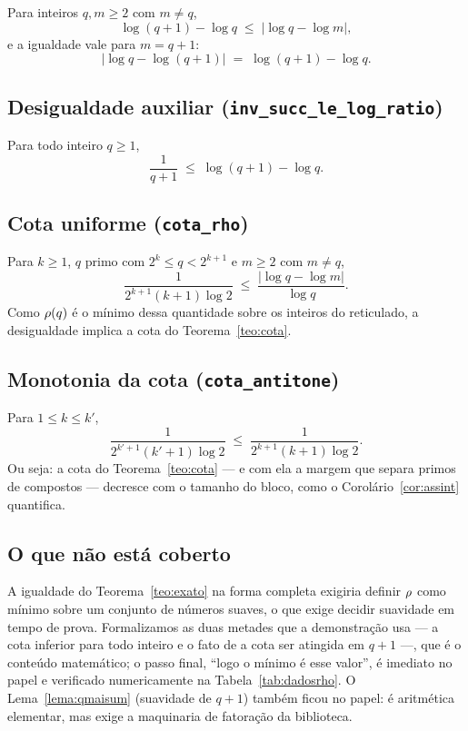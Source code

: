 \noindent Para inteiros $q,m\ge2$ com $m\neq q$,
\[
  \log(q+1)-\log q \;\le\; \bigl|\log q-\log m\bigr| ,
\]
e a igualdade vale para $m=q+1$:
\[
  \bigl|\log q-\log(q+1)\bigr| \;=\; \log(q+1)-\log q .
\]

\subsection*{Desigualdade auxiliar (\texttt{inv\_succ\_le\_log\_ratio})}

\noindent Para todo inteiro $q\ge1$,
\[
  \frac{1}{q+1} \;\le\; \log(q+1)-\log q .
\]

\subsection*{Cota uniforme (\texttt{cota\_rho})}

\noindent Para $k\ge1$, $q$ primo com $2^k\le q<2^{k+1}$ e $m\ge2$ com $m\neq q$,
\[
  \frac{1}{2^{k+1}(k+1)\log 2}
  \;\le\;
  \frac{\bigl|\log q-\log m\bigr|}{\log q} .
\]
Como $\rho(q)$ é o mínimo dessa quantidade sobre os inteiros do reticulado, a
desigualdade implica a cota do Teorema~\ref{teo:cota}.

\subsection*{Monotonia da cota (\texttt{cota\_antitone})}

\noindent Para $1\le k\le k'$,
\[
  \frac{1}{2^{k'+1}(k'+1)\log 2}
  \;\le\;
  \frac{1}{2^{k+1}(k+1)\log 2} .
\]
Ou seja: a cota do Teorema~\ref{teo:cota} — e com ela a margem que separa primos
de compostos — decresce com o tamanho do bloco, como o
Corolário~\ref{cor:assint} quantifica.

\subsection*{O que não está coberto}

A igualdade do Teorema~\ref{teo:exato} na forma completa exigiria definir $\rho$
como mínimo sobre um conjunto de números suaves, o que exige decidir suavidade em
tempo de prova. Formalizamos as duas metades que a demonstração usa — a cota
inferior para todo inteiro e o fato de a cota ser atingida em $q+1$ —, que é o
conteúdo matemático; o passo final, ``logo o mínimo é esse valor'', é imediato no
papel e verificado numericamente na Tabela~\ref{tab:dadosrho}. O
Lema~\ref{lema:qmaisum} (suavidade de $q+1$) também ficou no papel: é aritmética
elementar, mas exige a maquinaria de fatoração da biblioteca.

